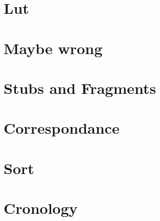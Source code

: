 \documentclass[12pt,leqno]{book}
\begin{document}
\part{Lut}



\part{Maybe wrong}


\part{Stubs and Fragments}





\part{Correspondance}














\part{Sort}














\part{Cronology}





\end{document}
